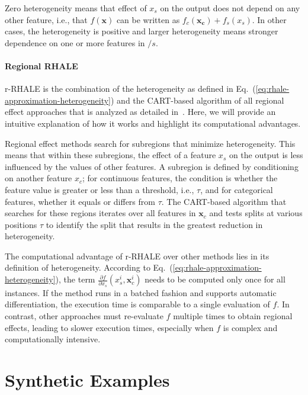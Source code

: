 \documentclass[
twocolumn,
]{ceurart}
\newcommand{\xb}{\mathbf{x}}
\newcommand{\xc}{\mathbf{x_c}}
\newcommand{\xci}{\mathbf{x}^i_c}
\begin{document}
\noindent
Zero heterogeneity means that effect of $x_s$ on the output does not depend on any other feature, i.e., that $f(\xb)$ can be written as $f_c(\xc) + f_s(x_s)$. In other cases, the heterogeneity is positive and larger heterogeneity means stronger dependence on one or more features in $/s$. 

\paragraph{Regional RHALE}

r-RHALE is the combination of the heterogeneity as defined in Eq.~(\ref{eq:rhale-approximation-heterogeneity}) and the CART-based algorithm of all regional effect approaches that is analyzed as detailed in~\cite{herbinger2023decomposing, gkolemis2024effector}. Here, we will provide an intuitive explanation of how it works and highlight its computational advantages.

Regional effect methods search for subregions that minimize heterogeneity. This means that within these subregions, the effect of a feature \( x_s \) on the output is less influenced by the values of other features. A subregion is defined by conditioning on another feature \( x_c \); for continuous features, the condition is whether the feature value is greater or less than a threshold, i.e., \( \tau \), and for categorical features, whether it equals or differs from \( \tau \). The CART-based algorithm that searches for these regions iterates over all features in \( \xb_c \) and tests splits at various positions \( \tau \) to identify the split that results in the greatest reduction in heterogeneity.

The computational advantage of r-RHALE over other methods lies in its definition of heterogeneity. According to Eq.~(\ref{eq:rhale-approximation-heterogeneity}), the term \( \frac{\partial f}{\partial x_s} (x_s^i, \xci) \) needs to be computed only once for all instances. If the method runs in a batched fashion and supports automatic differentiation, the execution time is comparable to a single evaluation of \( f \). In contrast, other approaches must re-evaluate \( f \) multiple times to obtain regional effects, leading to slower execution times, especially when \( f \) is complex and computationally intensive.

\section{Synthetic Examples}
\end{document}
